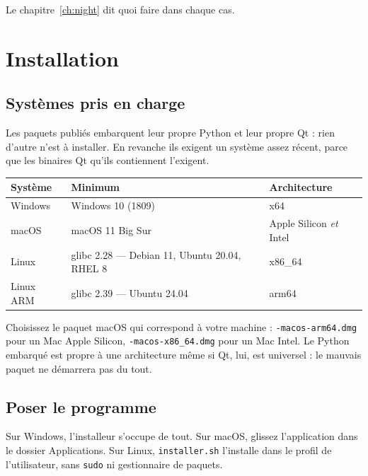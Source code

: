 Le chapitre~\ref{ch:night} dit quoi faire dans chaque cas.

\chapter{Installation}
\label{ch:install}

\section{Systèmes pris en charge}

Les paquets publiés embarquent leur propre Python et leur propre Qt : rien
d'autre n'est à installer. En revanche ils exigent un système assez récent,
parce que les binaires Qt qu'ils contiennent l'exigent.

\begin{center}
\begin{tabularx}{\textwidth}{lXl}
\toprule
\textbf{Système} & \textbf{Minimum} & \textbf{Architecture} \\
\midrule
Windows & Windows 10 (1809) & x64 \\
macOS & macOS 11 Big Sur & Apple Silicon \emph{et} Intel \\
Linux & glibc 2.28 --- Debian 11, Ubuntu 20.04, RHEL 8 & x86\_64 \\
Linux ARM & glibc 2.39 --- Ubuntu 24.04 & arm64 \\
\bottomrule
\end{tabularx}
\end{center}

\begin{warning}
Choisissez le paquet macOS qui correspond à votre machine :
\texttt{-macos-arm64.dmg} pour un Mac Apple Silicon, \texttt{-macos-x86\_64.dmg}
pour un Mac Intel. Le Python embarqué est propre à une architecture même si Qt,
lui, est universel : le mauvais paquet ne démarrera pas du tout.
\end{warning}

\section{Poser le programme}

Sur Windows, l'installeur s'occupe de tout. Sur macOS, glissez l'application
dans le dossier Applications. Sur Linux, \texttt{installer.sh} l'installe dans
le profil de l'utilisateur, sans \texttt{sudo} ni gestionnaire de paquets.


